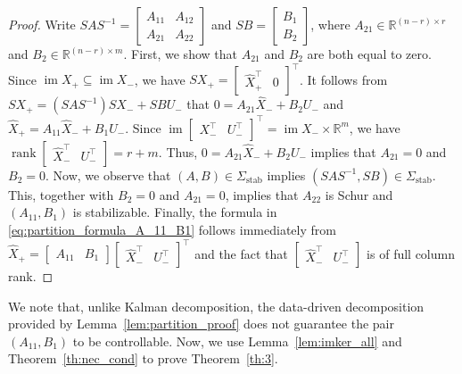 \documentclass[9pt,shortpaper,twoside,web]{ieeecolor}
\DeclareMathOperator{\rank}{rank}
\DeclareMathOperator{\im}{im}
\begin{document}
\begin{proof}
Write $SAS^{-1}=\begin{bmatrix}
A_{11} & A_{12} \\
A_{21} & A_{22}
\end{bmatrix}$ and \mbox{$SB=\begin{bmatrix}
B_1 \\ B_2
\end{bmatrix}$},
where $A_{21} \in \mathbb{R}^{(n-r)\times r}$ and $B_2 \in \mathbb{R}^{(n-r) \times m}$. First, we show that $A_{21}$ and $B_2$ are both equal to zero. Since $\im X_+\subseteq \im X_-$, we have \mbox{$SX_+=\begin{bmatrix}
\hat{X}_+^\top & 0
\end{bmatrix}^\top$}. It follows from \mbox{$SX_+=(SAS^{-1})SX_-+SBU_-$} that \mbox{$0=A_{21}\hat{X}_-+B_{2}U_-$} and $\hat{X}_+=A_{11}\hat{X}_-+B_{1}U_-$. Since \mbox{$\im \begin{bmatrix}
X_-^\top &
U_-^\top
\end{bmatrix}^\top=\im X_- \times \mathbb{R}^m$}, we have $\rank\begin{bmatrix}
\hat{X}_-^\top &
U_-^\top
\end{bmatrix}=r+m$. Thus, \mbox{$0=A_{21}\hat{X}_-+B_{2}U_-$} implies that $A_{21}=0$ and $B_2=0$. Now, we observe that $(A,B)\in\Sigma_\text{stab}$ implies $(SAS^{-1},SB)\in\Sigma_\text{stab}$. This, together with $B_2=0$ and $A_{21}=0$, implies that $A_{22}$ is Schur and $(A_{11},B_1)$ is stabilizable. Finally, the formula in \eqref{eq:partition_formula_A_11_B1} follows immediately from $\hat{X}_+=\begin{bmatrix}
A_{11} & B_{1}
\end{bmatrix}\begin{bmatrix}
\hat{X}_-^\top & U_-^\top
\end{bmatrix}^\top$ and the fact that $\begin{bmatrix}
\hat{X}_-^\top &
U_-^\top
\end{bmatrix}$ is of full column rank. 
\end{proof}

We note that, unlike Kalman decomposition, the data-driven decomposition provided by Lemma~\ref{lem:partition_proof} does not guarantee the pair $(A_{11},B_1)$ to be controllable. Now, we use Lemma~\ref{lem:imker_all} and Theorem~\ref{th:nec_cond} to prove Theorem~\ref{th:3}. 
\end{document}
